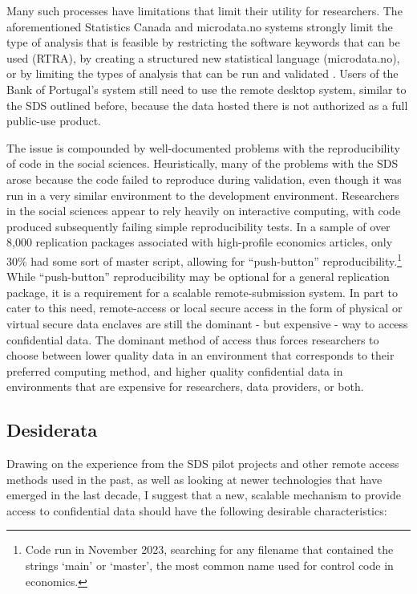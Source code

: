 \documentclass[12pt]{article}
\begin{document}
Many such processes have limitations that limit their utility for researchers. The aforementioned Statistics Canada and microdata.no systems strongly limit the type of analysis that is feasible by restricting the software keywords that can be used (RTRA), by creating a structured new statistical language (microdata.no), or by limiting the types of analysis that can be run and validated \citep{barrientos_providing_2018}. Users of the Bank of Portugal's system still need to use the remote desktop system, similar to the SDS outlined before, because the data hosted there is not authorized as a full public-use product.

The issue is compounded by well-documented problems with the reproducibility of code in the social sciences. Heuristically, many of the problems with the SDS arose because the code failed to reproduce during validation, even though it was  run in a very similar environment to the development environment. Researchers in the social sciences appear to rely heavily on interactive computing, with code produced subsequently failing simple reproducibility tests. In a sample of over 8,000 replication packages associated with high-profile economics articles, only 30\% had some sort of master script, allowing for ``push-button'' reproducibility.\footnote{Code run in November 2023, searching for any filename that contained the strings `main' or `master', the most common name used for control code in economics.} While ``push-button'' reproducibility may be optional for a general replication package, it is a requirement for a scalable remote-submission system. In part to cater to this need, remote-access or local secure access in the form of physical or virtual secure data enclaves are still the dominant - but expensive - way to access confidential data. The dominant method of access thus forces researchers to choose between lower quality data in an environment that corresponds to their preferred computing method, and higher quality confidential data in environments that are expensive for researchers, data providers, or both.

\subsection{Desiderata}
\label{sec:desiderata}

Drawing on the experience from the SDS pilot projects and other remote access methods used in the past, as well as looking at newer technologies that have emerged in the last decade, I suggest that a new, scalable mechanism to provide access to confidential data should have the following desirable characteristics:
\end{document}
